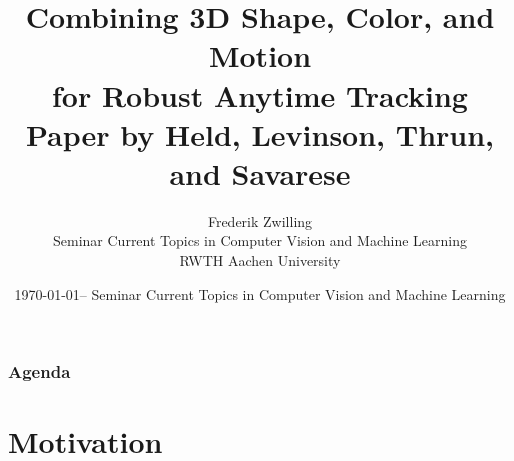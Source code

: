 

\newcommand{\backupbegin}{
   \newcounter{finalframe}
   \setcounter{finalframe}{\value{framenumber}}
}
\newcommand{\backupend}{
   \setcounter{framenumber}{\value{finalframe}}
}

\newcommand*\colvec[3][]{
    \begin{pmatrix}\ifx\relax#1\relax\else#1\\\fi#2\\#3\end{pmatrix}
}
\newcommand{\mattwo}[4]{\begin{pmatrix} #1 & #2 \\ #3 & #4\end{pmatrix}}

\title[Combining 3D Shape, Color, and Motion for Robust Anytime Tracking]{Combining 3D Shape, Color, and Motion\\ for Robust Anytime Tracking\\ \small{Paper by Held, Levinson, Thrun, and Savarese}}
\author[Zwilling]{%
  Frederik Zwilling\\
  \bigskip
  {\scriptsize Seminar Current Topics in Computer Vision and Machine Learning\\ RWTH Aachen University}
}

\date[\today @ Seminar CVML]{\today -- Seminar Current Topics in Computer Vision and Machine Learning}



\frame[plain]{\titlepage}
\addtocounter{framenumber}{-1}

\begin{frame}
  \frametitle{Agenda}
  \tableofcontents[hideallsubsections]
\end{frame}

\section{Motivation}

